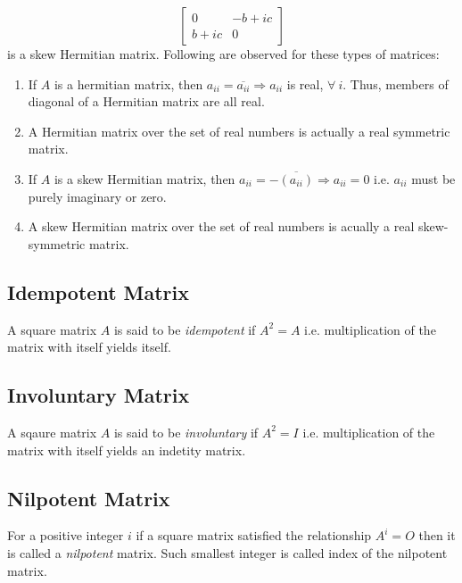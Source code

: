 \[\begin{bmatrix}0 & -b + ic \\ b + ic & 0\end{bmatrix}\] is a skew Hermitian matrix. Following are observed for these types of
matrices:
\begin{enumerate}
\item If $A$ is a hermitian matrix, then $a_{ii} = \overline{a_{ii}} \Rightarrow a_{ii}$ is real, $\forall~i.$ Thus, members of
  diagonal of a Hermitian matrix are all real.
\item A Hermitian matrix over the set of real numbers is actually a real symmetric matrix.
\item If $A$ is a skew Hermitian matrix, then $a_{ii} = -\overline{(a_{ii})} \Rightarrow a_{ii} = 0$ i.e. $a_{ii}$ must be purely
  imaginary or zero.
\item A skew Hermitian matrix over the set of real numbers is acually a real skew-symmetric matrix.
\end{enumerate}

\subsection{Idempotent Matrix}
A square matrix $A$ is said to be \textit{idempotent} if $A^2 = A$ i.e. multiplication of the matrix with itself yields itself.

\subsection{Involuntary Matrix}
A sqaure matrix $A$ is said to be \textit{involuntary} if $A^2 = I$ i.e. multiplication of the matrix with itself yields an
indetity matrix.

\subsection{Nilpotent Matrix}
For a positive integer $i$ if a square matrix satisfied the relationship $A^i = O$ then it is called a \textit{nilpotent}
matrix. Such smallest integer is called index of the nilpotent matrix.

